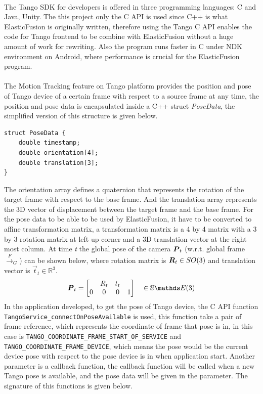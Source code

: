 \documentclass[12pt,twoside]{article}
\begin{document}
\\
The Tango SDK for developers is offered in three programming languages: C and Java, Unity. The this project only the C API is used since C++ is what ElasticFusion is originally written, therefore using the Tango C API enables the code for Tango frontend to be combine with ElasticFusion without a huge amount of work for rewriting. Also the program runs faster in C under NDK environment on Android, where performance is crucial for the ElasticFusion program.\\
\\
The Motion Tracking feature on Tango platform provides the position and pose of Tango device of a certain frame with respect to a source frame at any time, the position and pose data is encapsulated inside a C++ struct \textit{PoseData}, the simplified version of this structure is given below.
\begin{lstlisting}
struct PoseData {
	double timestamp;
    double orientation[4];
    double translation[3];
}
\end{lstlisting}
The orientation array defines a quaternion that represents the rotation of the target frame with respect to the base frame. And the translation array represents the 3D vector of displacement between the target frame and the base frame. For the pose data to be able to be used by ElasticFusion, it have to be converted to affine transformation matrix, a transformation matrix is a 4 by 4 matrix with a 3 by 3 rotation matrix at left up corner and a 3D translation vector at the right most column. At time \textit{t} the global pose of the camera ${\boldsymbol{{P}}}_t$ (w.r.t. global frame $\xrightarrow{\textit{F}}_G$) can be shown below, where rotation matrix is ${\boldsymbol{{R}}}_t \in SO(3)$ and translation vector is $\vec t_t \in \mathbb{R}^3$.
\begin{align}
\mat P_t = \begin{bmatrix}
& R_t & t_t\\
0 & 0 & 0 & 1
\end{bmatrix} \quad  \in \mathbb{S}\E(3)
\end{align}
In the application developed, to get the pose of Tango device, the C API function \verb|TangoService_connectOnPoseAvailable| is used, this function take a pair of frame reference, which represents the coordinate of frame that pose is in, in this case is \verb|TANGO_COORDINATE_FRAME_START_OF_SERVICE| and \verb|TANGO_COORDINATE_FRAME_DEVICE|, which means the pose would be the current device pose with respect to the pose device is in when application start. Another parameter is a callback function, the callback function will be called when a new Tango pose is available, and the pose data will be given in the parameter. The signature of this functions is given below.
\end{document}
